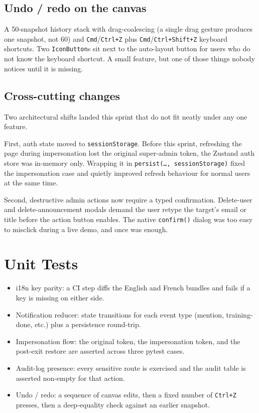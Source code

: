 \documentclass[12pt, a4paper, oneside]{report}
\begin{document}
\subsection{Undo / redo on the canvas}

A 50-snapshot history stack with drag-coalescing (a single drag
gesture produces one snapshot, not 60) and
\texttt{Cmd}/\texttt{Ctrl+Z} plus
\texttt{Cmd}/\texttt{Ctrl+Shift+Z} keyboard shortcuts. Two
\texttt{IconButton}s sit next to the auto-layout button for users
who do not know the keyboard shortcut. A small feature, but one of
those things nobody notices until it is missing.

\subsection{Cross-cutting changes}

Two architectural shifts landed this sprint that do not fit neatly
under any one feature.

First, auth state moved to \texttt{sessionStorage}. Before this
sprint, refreshing the page during impersonation lost the original
super-admin token, the Zustand auth store was in-memory only.
Wrapping it in \texttt{persist(\ldots,\,sessionStorage)} fixed the
impersonation case and quietly improved refresh behaviour for normal
users at the same time.

Second, destructive admin actions now require a typed confirmation.
Delete-user and delete-announcement modals demand the user retype
the target's email or title before the action button enables. The
native \texttt{confirm()} dialog was too easy to misclick during a
live demo, and once was enough.

\section{Unit Tests}

\begin{itemize}
    \item i18n key parity: a CI step diffs the English and French
        bundles and fails if a key is missing on either side.
    \item Notification reducer: state transitions for each event
        type (mention, training-done, etc.) plus a persistence
        round-trip.
    \item Impersonation flow: the original token, the
        impersonation token, and the post-exit restore are
        asserted across three pytest cases.
    \item Audit-log presence: every sensitive route is exercised
        and the audit table is asserted non-empty for that action.
    \item Undo / redo: a sequence of canvas edits, then a fixed
        number of \texttt{Ctrl+Z} presses, then a deep-equality
        check against an earlier snapshot.
\end{itemize}
\end{document}
